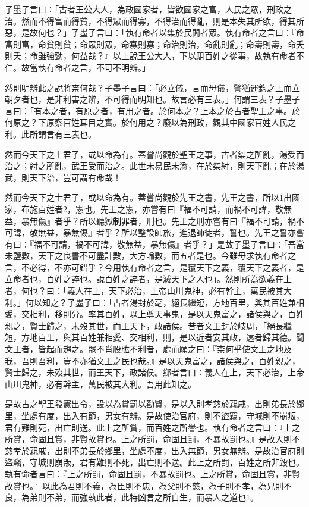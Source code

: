 
\begin{pinyinscope}
子墨子言曰：「古者王公大人，為政國家者，皆欲國家之富，人民之眾，刑政之治。然而不得富而得貧，不得眾而得寡，不得治而得亂，則是本失其所欲，得其所惡，是故何也？」子墨子言曰：「執有命者以集於民閒者眾。執有命者之言曰：『命富則富，命貧則貧；命眾則眾，命寡則寡；命治則治，命亂則亂；命壽則壽，命夭則夭；命雖強勁，何益哉？』以上說王公大人，下以駔百姓之從事，故執有命者不仁。故當執有命者之言，不可不明辨。」

然則明辨此之說將柰何哉？子墨子言曰：「必立儀，言而毋儀，譬猶運鈞之上而立朝夕者也，是非利害之辨，不可得而明知也。故言必有三表。」何謂三表？子墨子言曰：「有本之者，有原之者，有用之者。於何本之？上本之於古者聖王之事。於何原之？下原察百姓耳目之實。於何用之？廢以為刑政，觀其中國家百姓人民之利。此所謂言有三表也。

然而今天下之士君子，或以命為有。蓋嘗尚觀於聖王之事，古者桀之所亂，湯受而治之；紂之所亂，武王受而治之。此世未易民未渝，在於桀紂，則天下亂；在於湯武，則天下治，豈可謂有命哉！

然而今天下之士君子，或以命為有。蓋嘗尚觀於先王之書，先王之書，所以1出國家，布施百姓者2，憲也。先王之憲，亦嘗有曰『福不可請，而禍不可諱，敬無益，暴無傷』者乎？所以聽獄制罪者，刑也。先王之刑亦嘗有曰『福不可請，禍不可諱，敬無益，暴無傷』者乎？所以整設師旅，進退師徒者，誓也。先王之誓亦嘗有曰：『福不可請，禍不可諱，敬無益，暴無傷』者乎？」是故子墨子言曰：「吾當未鹽數，天下之良書不可盡計數，大方論數，而五者是也。今雖毋求執有命者之言，不必得，不亦可錯乎？今用執有命者之言，是覆天下之義，覆天下之義者，是立命者也，百姓之誶也。說百姓之誶者，是滅天下之人也」。然則所為欲義在上者，何也？曰：「義人在上，天下必治，上帝山川鬼神，必有幹主，萬民被其大利。」何以知之？子墨子曰：「古者湯封於亳，絕長繼短，方地百里，與其百姓兼相愛，交相利，移則分。率其百姓，以上尊天事鬼，是以天鬼富之，諸侯與之，百姓親之，賢士歸之，未歿其世，而王天下，政諸侯。昔者文王封於岐周，「絕長繼短，方地百里，與其百姓兼相愛、交相利，則，是以近者安其政，遠者歸其德。聞文王者，皆起而趨之。罷不肖股肱不利者，處而願之曰：『柰何乎使文王之地及我，吾則吾利，豈不亦猶文王之民也哉。』是以天鬼富之，諸侯與之，百姓親之，賢士歸之，未歿其世，而王天下，政諸侯。鄉者言曰：義人在上，天下必治，上帝山川鬼神，必有幹主，萬民被其大利。吾用此知之。

是故古之聖王發憲出令，設以為賞罰以勸賢，是以入則孝慈於親戚，出則弟長於鄉里，坐處有度，出入有節，男女有辨。是故使治官府，則不盜竊，守城則不崩叛，君有難則死，出亡則送。此上之所賞，而百姓之所譽也。執有命者之言曰：『上之所賞，命固且賞，非賢故賞也。上之所罰，命固且罰，不暴故罰也。』是故入則不慈孝於親戚，出則不弟長於鄉里，坐處不度，出入無節，男女無辨。是故治官府則盜竊，守城則崩叛，君有難則不死，出亡則不送。此上之所罰，百姓之所非毀也。執有命者言曰：『上之所罰，命固且罰，不暴故罰也。上之所賞，命固且賞，非賢故賞也。』以此為君則不義，為臣則不忠，為父則不慈，為子則不孝，為兄則不良，為弟則不弟，而強執此者，此特凶言之所自生，而暴人之道也1。


\end{pinyinscope}

